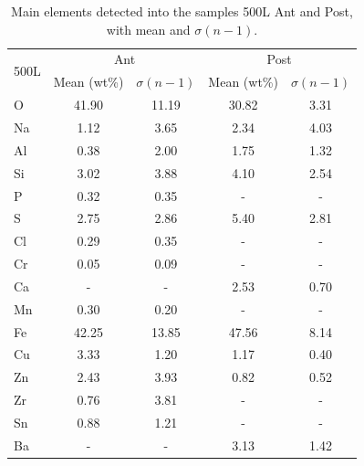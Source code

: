 \begin{table}[H]\centering
  \begin{tabular}{lcccc}
    \toprule
    \multirow{2}{*}[-0.5\dimexpr \aboverulesep + \belowrulesep + \cmidrulewidth]{500L}
    & \multicolumn{2}{c}{Ant} & \multicolumn{2}{c}{Post} \\
    \cmidrule(l){2-3} \cmidrule(l){4-5}
    & Mean (wt\%) & $\sigma (n-1)$ & Mean (wt\%) & $\sigma (n-1)$ \\
    \midrule
    O & 41.90 & 11.19 & 30.82 & 3.31 \\
    Na & 1.12 & 3.65 & 2.34 & 4.03 \\
    Al & 0.38 & 2.00 & 1.75 & 1.32 \\
    Si & 3.02 & 3.88 & 4.10 & 2.54 \\
    P & 0.32 & 0.35 & - & - \\
    S & 2.75 & 2.86 & 5.40 & 2.81 \\
    Cl & 0.29 & 0.35 & - & - \\
    Cr & 0.05 & 0.09 & - & - \\
    Ca & - & - & 2.53 & 0.70 \\
    Mn & 0.30 & 0.20 & - & - \\
    Fe & 42.25 & 13.85 & 47.56 & 8.14 \\
    Cu & 3.33 & 1.20 & 1.17 & 0.40 \\
    Zn & 2.43 & 3.93 & 0.82 & 0.52 \\
    Zr & 0.76 & 3.81 & - & - \\
    Sn & 0.88 & 1.21 & - & - \\
    Ba & - & - & 3.13 & 1.42 \\
    \bottomrule
  \end{tabular}
    \caption{Main elements detected into the samples 500L Ant and Post, with mean and $\sigma (n-1)$.}
    \label{fig:Elements_500L}
\end{table}

